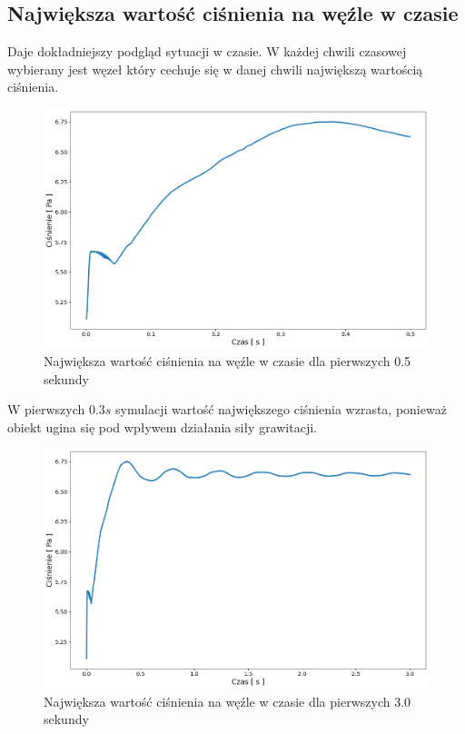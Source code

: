 \documentclass[12pt, letterpaper]{report}
\begin{document}
    \subsection{Największa wartość ciśnienia na węźle w czasie}
    Daje dokładniejszy podgląd sytuacji w czasie. W każdej chwili czasowej wybierany jest węzeł 
    który cechuje się w danej chwili największą wartością ciśnienia.

    \begin{figure}[H]
        \centering
        \includegraphics[width=16cm]{pressure_pressure_01}
        \caption{
            Największa wartość ciśnienia na węźle w czasie dla pierwszych 0.5 sekundy
        }
    \end{figure}

    W pierwszych $0.3s$ symulacji wartość największego ciśnienia wzrasta, ponieważ obiekt
    ugina się pod wpływem działania siły grawitacji.

    \begin{figure}[H]
        \centering
        \includegraphics[width=16cm]{pressure_pressure_02}
        \caption{
            Największa wartość ciśnienia na węźle w czasie dla pierwszych 3.0 sekundy
        }
    \end{figure}
\end{document}
